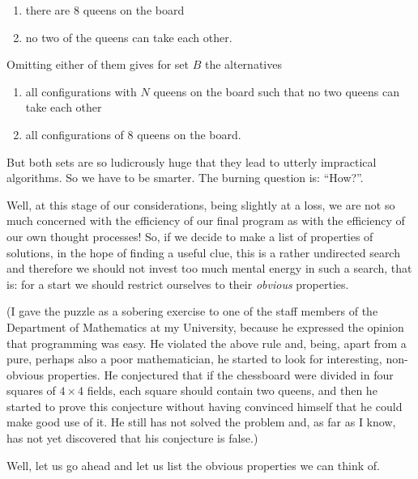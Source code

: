 \documentclass[twoside,11pt]{book}
\begin{document}
\begin{enumerate}[wide, nosep, label=(\arabic*)]
	\item there are 8 queens on the board
	\item no two of the queens can take each other.
\end{enumerate}

Omitting either of them gives for set $B$ the alternatives

\begin{enumerate}[leftmargin=*, itemindent=1.9em, label=B\arabic*:]
	\item \label{en:b1-eight-queens}
	all configurations with $N$ queens on the board such that no two queens can take each other
	\item \label{en:b2-eight-queens}
	all configurations of 8 queens on the board.
\end{enumerate}

But both sets are so ludicrously huge that they lead to utterly impractical algorithms. So we have to be smarter. The burning question is: ``How?''.

Well, at this stage of our considerations, being slightly at a loss, we are not so much concerned with the efficiency of our final program as with the efficiency of our own thought processes! So, if we decide to make a list of properties of solutions, in the hope of finding a useful clue, this is a rather undirected search and therefore we should not invest too much mental energy in such a search, that is: for a start we should restrict ourselves to their \textit{obvious} properties.

(I gave the puzzle as a sobering exercise to one of the staff members of the Department of Mathematics at my University, because he expressed the opinion that programming was easy. He violated the above rule and, being, apart from a pure, perhaps also a poor mathematician, he started to look for interesting, non-obvious properties. He conjectured that if the chessboard were divided in four squares of $4\times 4$ fields, each square should contain two queens, and then he started to prove this conjecture without having convinced himself that he could make good use of it. He still has not solved the problem and, as far as I know, has not yet discovered that his conjecture is false.)

Well, let us go ahead and let us list the obvious properties we can think of.
\end{document}
